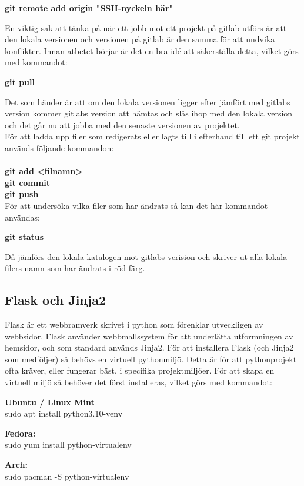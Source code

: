 \documentclass{TDP003mall}
\begin{document}
{\textbf{git remote add origin "SSH-nyckeln här"}

En viktig sak att tänka på när ett jobb mot ett projekt på gitlab utförs är att den lokala versionen och versionen på gitlab är den samma för att undvika konflikter. Innan atbetet börjar är det en bra idé att säkerställa detta, vilket görs med kommandot:

\textbf{git pull}

Det som händer är att om den lokala versionen ligger efter jämfört med gitlabs version kommer gitlabs version att hämtas och slås ihop med den lokala version och det går nu att jobba med den senaste versionen av projektet.\\
För att ladda upp filer som redigerats eller lagts till i efterhand till ett git projekt används följande kommandon:\\\\
\textbf{git add <filnamn>}\\
\textbf{git commit}\\
\textbf{git push}\\

För att undersöka vilka filer som har ändrats så kan det här kommandot användas:

\textbf{git status}

Då jämförs den lokala katalogen mot gitlabs verision och skriver ut alla lokala filers namn som har ändrats i röd färg.

\subsection{Flask och Jinja2}

Flask är ett webbramverk skrivet i python som förenklar utveckligen av webbsidor. Flask använder webbmallssystem för att underlätta utformningen av hemsidor, och som standard används Jinja2.  För att installera Flask (och Jinja2 som medföljer) så behövs en virtuell pythonmiljö. Detta är för att pythonprojekt ofta kräver, eller fungerar bäst, i specifika projektmiljöer. För att skapa en virtuell miljö så behöver det först installeras, vilket görs med kommandot:

\textbf{Ubuntu / Linux Mint}\\
sudo apt install python3.10-venv

\textbf{Fedora:}\\
sudo yum install python-virtualenv

\textbf{Arch:}\\
sudo pacman -S python-virtualenv

}
\end{document}
